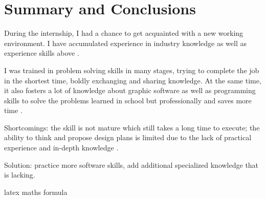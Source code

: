 \chapter{Summary and Conclusions}
During the internship, I had a chance to get acquainted with a new working environment. I have accumulated experience in industry knowledge as well as experience skills above \cite{marghitu_2009_mechanisms}.

I was trained in problem solving skills in many stages, trying to complete the job in the shortest time, boldly exchanging and sharing knowledge. At the same time, it also fosters a lot of knowledge about graphic software as well as programming skills to solve the problems learned in school but professionally and saves more time \cite{li_1984_hng}.

Shortcomings: the skill is not mature which still takes a long time to execute; the ability to think and propose design plans is limited due to the lack of practical experience and in-depth knowledge \cite{li_1984_hng}.

Solution: practice more software skills, add additional specialized knowledge that is lacking.

\gls{latex}
\gls{maths}
\gls{formula}